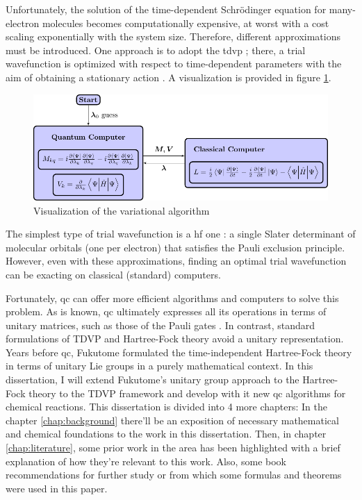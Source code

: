 \documentclass{aux/ttuthes2007}
\begin{document}
Unfortunately, the solution of the time-dependent Schrödinger equation for many-electron molecules becomes computationally expensive, at worst with a cost scaling exponentially with the system size.
Therefore, different approximations must be introduced.
One approach is to adopt the \gls{tdvp} ;
there, a trial wavefunction is optimized with respect to time-dependent parameters with the aim of obtaining a stationary action . A visualization is provided in figure \ref{fig:TDVP}.

\begin{figure}[ht!]
	\centering
  \includegraphics[width=\linewidth]{img/variation_figure.pdf}
  \caption{Visualization of the variational algorithm}
  \label{fig:TDVP}
\end{figure}

The simplest type of trial wavefunction is a \gls{hf} one :
a single Slater determinant of molecular orbitals (one per electron) that satisfies the Pauli exclusion principle.
However, even with these approximations, finding an optimal trial wavefunction can be exacting on classical (standard) computers.

Fortunately, \gls{qc}  can offer more efficient algorithms and computers to solve this problem.
As is known, \gls{qc} ultimately expresses all its operations in terms of unitary matrices, such as those of the Pauli gates .
In contrast, standard formulations of TDVP and Hartree-Fock theory  avoid a unitary representation.
Years before \gls{qc}, Fukutome  formulated the time-independent Hartree-Fock theory in terms of unitary Lie groups  in a purely mathematical context.
In this dissertation, I will extend Fukutome’s unitary group approach to the Hartree-Fock theory to the TDVP framework and develop with it new \gls{qc} algorithms for chemical reactions.
This dissertation is divided into 4 more chapters: In the chapter \ref{chap:background} there'll be an exposition of necessary mathematical and chemical foundations to the work in this dissertation.
Then, in chapter \ref{chap:literature}, some prior work in the area has been highlighted with a brief explanation of how they're relevant to this work.
Also, some book recommendations for further study or from which some formulas and theorems were used in this paper.
\end{document}

